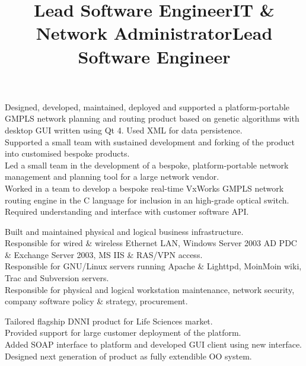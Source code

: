 \documentclass{resume}
\begin{document}
\begin{resume}
\title{\bf{Lead Software Engineer}}
\begin{position}
Designed, developed, maintained, deployed and supported a platform-portable GMPLS network planning and routing product based on genetic algorithms with desktop GUI written using Qt 4.  Used XML for data persistence.\vspace{1mm}\\
Supported a small team with sustained development and forking of the product into customised bespoke products.\vspace{1mm}\\
Led a small team in the development of a bespoke, platform-portable network management and planning tool for a large network vendor.\vspace{1mm}\\
Worked in a team to develop a bespoke real-time VxWorks GMPLS network routing engine in the C language for inclusion in an high-grade optical switch.  Required understanding and interface with customer software API.
\end{position}

\title{\bf IT \& Network Administrator}
\begin{position}
Built and maintained physical and logical business infrastructure.\vspace{1mm}\\
Responsible for wired \& wireless Ethernet LAN, Windows Server 2003 AD PDC \& Exchange Server 2003, MS IIS \& RAS/VPN access.\vspace{1mm}\\
Responsible for GNU/Linux servers running Apache \& Lighttpd, MoinMoin wiki, Trac and Subversion servers.\vspace{1mm}\\
Responsible for physical and logical workstation maintenance, network security, company software policy \& strategy, procurement.
\end{position}

\title{\bf Lead Software Engineer}
\begin{position}
Tailored flagship DNNI product for Life Sciences market.\vspace{1mm}\\
Provided support for large customer deployment of the platform.\vspace{1mm}\\
Added SOAP interface to platform and developed GUI client using new interface.\vspace{1mm}\\
Designed next generation of product as fully extendible OO system.
\end{position}


\end{resume}
\end{document}
